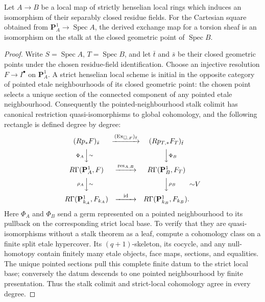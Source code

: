\begin{proposition}
\label{prop:weil-pbc-projective-line-strict-henselian}
\uses{}

Let $A\to B$ be a local map of strictly henselian local rings which induces
an isomorphism of their separably closed residue fields.  For the Cartesian
square obtained from $\mathbf P^1_A\to\operatorname{Spec}A$, the derived
exchange map for a torsion sheaf is an isomorphism on the stalk at the closed
geometric point of $\operatorname{Spec}B$.
\end{proposition}
\begin{proof}

Write $S=\operatorname{Spec}A$, $T=\operatorname{Spec}B$, and let
$\bar t$ and $\bar s$ be their closed geometric points under the chosen
residue-field identification.  Choose an injective resolution
$F\to I^\bullet$ on $\mathbf P^1_A$.  A strict henselian local scheme is
initial in the opposite category of pointed etale neighbourhoods of its
closed geometric point: the chosen point selects a unique section of the
connected component of any pointed etale neighbourhood.  Consequently the
pointed-neighbourhood stalk colimit has canonical restriction quasi-isomorphisms to global
cohomology, and the following rectangle is defined degree by degree:
\[
\begin{CD}
 (Rp_*F)_{\bar s} @>{(\operatorname{Ex}_{\square,F})_{\bar t}}>>
 (Rp_{T,*}F_T)_{\bar t}\\
 @V{\Phi_A}V{\sim}V @VV{\Phi_B}V\\
 R\Gamma(\mathbf P^1_A,F) @>{\operatorname{res}_{A,B}}>>
 R\Gamma(\mathbf P^1_B,F_T)\\
 @V{\rho_A}V{\sim}V @VV{\rho_B}V{\sim}V\\
 R\Gamma(\mathbf P^1_{k_A},F_{k_A}) @>{\operatorname{id}}>>
 R\Gamma(\mathbf P^1_{k_B},F_{k_B}).
\end{CD}
\]
Here $\Phi_A$ and $\Phi_B$ send a germ represented on a pointed
neighbourhood to its pullback on the corresponding strict local base.  To
verify that they are quasi-isomorphisms without a stalk theorem as a leaf,
compute a cohomology class on a finite split etale hypercover.  Its
$(q+1)$-skeleton, its cocycle, and any null-homotopy contain finitely many
etale objects, face maps, sections, and equalities.  The unique pointed
sections pull this complete finite datum to the strict local base; conversely
the datum descends to one pointed neighbourhood by finite presentation.
Thus the stalk colimit and strict-local cohomology agree in every degree.


\end{proof}
